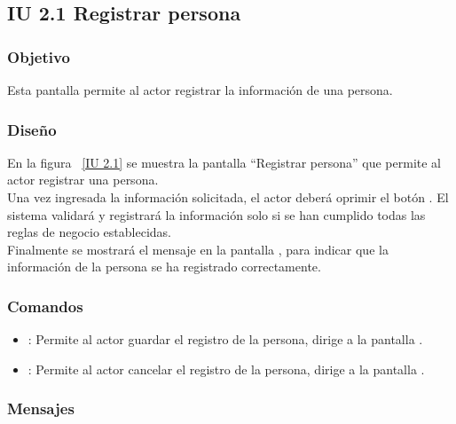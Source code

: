 \newpage 
\subsection{IU 2.1 Registrar persona}

\subsubsection{Objetivo}
	
    Esta pantalla permite al actor registrar la información de una persona.

\subsubsection{Diseño}

    En la figura ~\ref{IU 2.1} se muestra la pantalla ``Registrar persona'' que permite al actor registrar una persona. \\
    
    Una vez ingresada la información solicitada, el actor deberá oprimir el botón . El sistema validará y registrará la 
    información solo si se han cumplido todas las reglas de negocio establecidas.  \\
    
    Finalmente se mostrará el mensaje  en la pantalla , 
    para indicar que la información de la persona
    se ha registrado correctamente.        



\subsubsection{Comandos}
\begin{itemize}
	\item {}: Permite al actor guardar el registro de la persona, dirige a la pantalla .
	\item {}: Permite al actor cancelar el registro de la persona, dirige a la pantalla .
\end{itemize}

\subsubsection{Mensajes}
	
